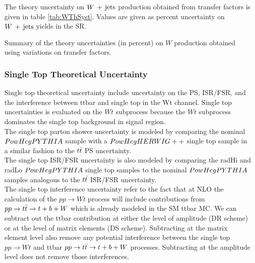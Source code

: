 \indent The theory uncertainty on $W\,+\,\mathrm{jets}$ production obtained from transfer factors is given in table \ref{tab:WThSyst}.  Values are given as percent uncertainty on $W\,+\,\mathrm{jets}$ yields in the SR.  \\

  \begin{table}[!h]
    \begin{center} \footnotesize

    \end{center}
    \caption{Summary of the theory uncertainties (in percent) on $W$ production obtained using variations on transfer factors. }
    \label{tab:WThSyst}
  \end{table}        

\subsubsection*{Single Top Theoretical Uncertainty}

\indent Single top theoretical uncertainty include uncertainty on the PS, ISR/FSR, and the interference between ttbar and single top in the Wt channel.  Single top uncertainties is evaluated on the $Wt$ subprocess because the $Wt$ subprocess dominates the single top background in signal region.  \\

\indent The single top parton shower uncertainty is modeled by comparing the nominal $PowHegPYTHIA$ sample with a $PowHegHERWIG++$ single top sample in a similar fashion to the $t\bar{t}$ PS uncertainty.  \\

\indent The single top ISR/FSR uncertainty is also modeled by comparing the radHi and radLo $PowHegPYTHIA$ single top samples to the nominal $PowHegPYTHIA$ samples analogous to the $t\bar{t}$ ISR/FSR uncertainty. \\

\indent The single top interference uncertainty refer to the fact that at NLO the calculation of the $pp \rightarrow Wt$ process will include contributions from $ pp \rightarrow t\bar{t} \rightarrow t + b + W$ which is already modeled in the SM ttbar MC.  We can subtract out the ttbar contribution at either the level of amplitude (DR scheme) or at the level of matrix elements (DS scheme).  Subtracting at the matrix element level also remove any potential interference between the single top $pp \rightarrow Wt$ and ttbar $ pp \rightarrow t\bar{t} \rightarrow t + b + W$ processes.  Subtracting at the amplitude level does not remove those interferences. \\

